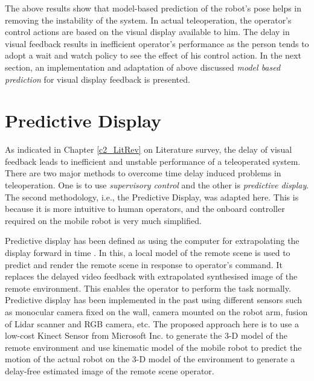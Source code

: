The above results show that model-based prediction of the robot's pose helps in removing the instability of the system. In  actual teleoperation, the operator's control actions are based on the visual display available to him.  The delay in visual feedback results in inefficient operator's performance as the person tends to adopt a wait and watch policy to see the effect of his control action. In the next section,  an implementation and adaptation  of above discussed \textit{model based prediction }  for  visual display feedback is presented.   
  
\section{Predictive Display}
As indicated in Chapter \ref{c2_LitRev} on Literature survey,  the delay of visual feedback leads to inefficient and unstable performance of a teleoperated system. There are two major methods to overcome time delay induced problems in teleoperation. One is to use \textit{supervisory control} and the other is \textit{predictive display}. The second methodology, i.e., the Predictive Display, was adapted here. This is because it is more intuitive to human operators, and the onboard controller  required on the mobile robot is very much simplified.  

  
Predictive display has been defined as using the computer for extrapolating the display forward in time \cite{sheridan}. In this, a local model of the remote scene is used to predict and render the remote scene in response to operator's command. It replaces the delayed video feedback with extrapolated synthesised  image of the remote environment. This enables the operator to perform the task normally. Predictive display has been implemented in the past using different sensors such as monocular camera fixed on the wall, camera mounted on the robot arm, fusion of Lidar scanner and RGB camera, etc. 
The proposed approach here is to use a low-cost  Kinect Sensor from Microsoft Inc. to generate the 3-D model of the remote environment and use kinematic model of the mobile robot to predict the motion of the actual robot on the 3-D model of the environment  to generate a delay-free estimated image of the remote scene operator.


